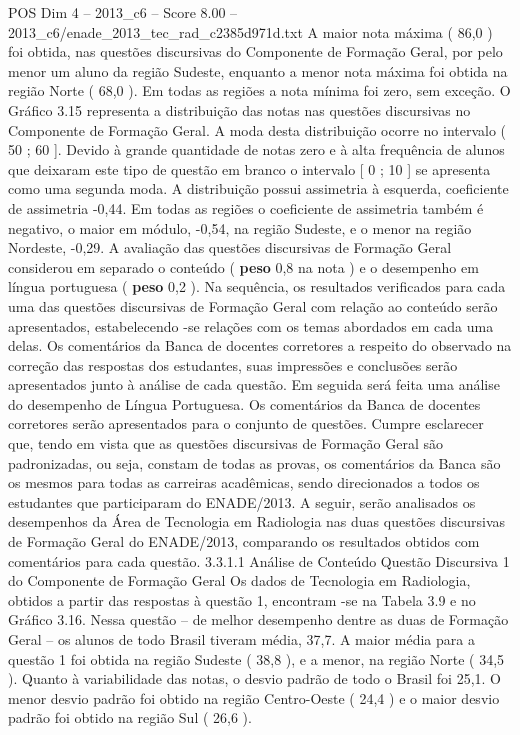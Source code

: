 \begin{textsample}{POS Dim 4 – 2013\_c6 – Score 8.00 – 2013\_c6/enade\_2013\_tec\_rad\_c2385d971d.txt}
A maior nota máxima ( 86,0 ) foi obtida, nas questões discursivas do Componente de Formação Geral, por pelo menor um aluno da região Sudeste, enquanto a menor nota máxima foi obtida na região Norte ( 68,0 ).
Em todas as regiões a nota mínima foi zero, sem exceção.
O Gráfico 3.15 representa a distribuição das notas nas questões discursivas no Componente de Formação Geral.
A moda desta distribuição ocorre no intervalo ( 50 ; 60 ].
Devido à grande quantidade de notas zero e à alta frequência de alunos que deixaram este tipo de questão em branco o intervalo [ 0 ; 10 ] se apresenta como uma segunda moda.
A distribuição possui assimetria à esquerda, coeficiente de assimetria -0,44.
Em todas as regiões o coeficiente de assimetria também é negativo, o maior em módulo, -0,54, na região Sudeste, e o menor na região Nordeste, -0,29.
A avaliação das questões discursivas de Formação Geral considerou em separado o conteúdo ( \textbf{peso} 0,8 na nota ) e o desempenho em língua portuguesa ( \textbf{peso} 0,2 ).
Na sequência, os resultados verificados para cada uma das questões discursivas de Formação Geral com relação ao conteúdo serão apresentados, estabelecendo -se relações com os temas abordados em cada uma delas.
Os comentários da Banca de docentes corretores a respeito do observado na correção das respostas dos estudantes, suas impressões e conclusões serão apresentados junto à análise de cada questão.
Em seguida será feita uma análise do desempenho de Língua Portuguesa.
Os comentários da Banca de docentes corretores serão apresentados para o conjunto de questões.
Cumpre esclarecer que, tendo em vista que as questões discursivas de Formação Geral são padronizadas, ou seja, constam de todas as provas, os comentários da Banca são os mesmos para todas as carreiras acadêmicas, sendo direcionados a todos os estudantes que participaram do ENADE/2013.
A seguir, serão analisados os desempenhos da Área de Tecnologia em Radiologia nas duas questões discursivas de Formação Geral do ENADE/2013, comparando os resultados obtidos com comentários para cada questão. 3.3.1.1 Análise de Conteúdo Questão Discursiva 1 do Componente de Formação Geral Os dados de Tecnologia em Radiologia, obtidos a partir das respostas à questão 1, encontram -se na Tabela 3.9 e no Gráfico 3.16.
Nessa questão – de melhor desempenho dentre as duas de Formação Geral – os alunos de todo Brasil tiveram média, 37,7.
A maior média para a questão 1 foi obtida na região Sudeste ( 38,8 ), e a menor, na região Norte ( 34,5 ).
Quanto à variabilidade das notas, o desvio padrão de todo o Brasil foi 25,1.
O menor desvio padrão foi obtido na região Centro-Oeste ( 24,4 ) e o maior desvio padrão foi obtido na região Sul ( 26,6 ).

\end{textsample}
